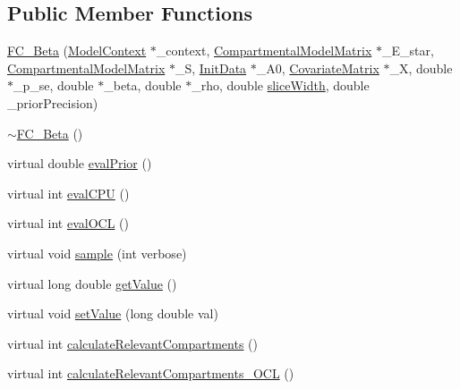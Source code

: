 \subsection*{Public Member Functions}
\begin{DoxyCompactItemize}
\item 
\hyperlink{classSpatialSEIR_1_1FC__Beta_a98918753da7fe5c3e7ae0de9a40cbf7d}{F\-C\-\_\-\-Beta} (\hyperlink{classSpatialSEIR_1_1ModelContext}{Model\-Context} $\ast$\-\_\-context, \hyperlink{classSpatialSEIR_1_1CompartmentalModelMatrix}{Compartmental\-Model\-Matrix} $\ast$\-\_\-\-E\-\_\-star, \hyperlink{classSpatialSEIR_1_1CompartmentalModelMatrix}{Compartmental\-Model\-Matrix} $\ast$\-\_\-\-S, \hyperlink{classSpatialSEIR_1_1InitData}{Init\-Data} $\ast$\-\_\-\-A0, \hyperlink{classSpatialSEIR_1_1CovariateMatrix}{Covariate\-Matrix} $\ast$\-\_\-\-X, double $\ast$\-\_\-p\-\_\-se, double $\ast$\-\_\-beta, double $\ast$\-\_\-rho, double \hyperlink{classSpatialSEIR_1_1FullConditional_a150ee031af8d086ad0a04b13630a110f}{slice\-Width}, double \-\_\-prior\-Precision)
\item 
\hyperlink{classSpatialSEIR_1_1FC__Beta_a47a6b14b1b441b9cd33ff8b59a644c44}{$\sim$\-F\-C\-\_\-\-Beta} ()
\item 
virtual double \hyperlink{classSpatialSEIR_1_1FC__Beta_a825ac001a023c64c6da372eedfae0e6e}{eval\-Prior} ()
\item 
virtual int \hyperlink{classSpatialSEIR_1_1FC__Beta_ae6f07bc7a0ef7ec660d1daadd060aad1}{eval\-C\-P\-U} ()
\item 
virtual int \hyperlink{classSpatialSEIR_1_1FC__Beta_a882c2de38ecfa3a425010874dfacda0f}{eval\-O\-C\-L} ()
\item 
virtual void \hyperlink{classSpatialSEIR_1_1FC__Beta_a96c2d002394eeee8cbcf7d06b8593dfc}{sample} (int verbose)
\item 
virtual long double \hyperlink{classSpatialSEIR_1_1FC__Beta_a3d25a7f6965f0a899249b76d8bd9d75f}{get\-Value} ()
\item 
virtual void \hyperlink{classSpatialSEIR_1_1FC__Beta_a545ac3e04204a54d6f34c4356f474e42}{set\-Value} (long double val)
\item 
virtual int \hyperlink{classSpatialSEIR_1_1FC__Beta_ae5a92d2c0ebd51328296a8db45fc52ad}{calculate\-Relevant\-Compartments} ()
\item 
virtual int \hyperlink{classSpatialSEIR_1_1FC__Beta_ac82fb2f313216cd5ebe611fbdf266416}{calculate\-Relevant\-Compartments\-\_\-\-O\-C\-L} ()
\end{DoxyCompactItemize}
